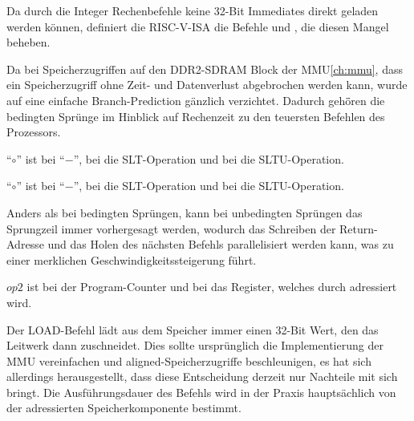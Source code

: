 
Da durch die Integer Rechenbefehle keine 32-Bit Immediates direkt geladen werden
k\"onnen, definiert die RISC-V-ISA die Befehle  und , die
diesen Mangel beheben.



Da bei Speicherzugriffen auf den DDR2-SDRAM Block der MMU\ref{ch:mmu}, dass ein
Speicherzugriff ohne Zeit- und Datenverlust abgebrochen werden kann, wurde auf
eine einfache Branch-Prediction g\"anzlich verzichtet. Dadurch geh\"ören die
bedingten Spr\"unge im Hinblick auf Rechenzeit zu den teuersten Befehlen des
Prozessors.

{``\(\circ\)'' ist bei  ``\(-\)'', bei  die SLT-Operation
und bei  die SLTU-Operation.
}

{``\(\circ\)'' ist bei  ``\(-\)'', bei  die SLT-Operation
und bei  die SLTU-Operation.
}

Anders als bei bedingten Spr\"ungen, kann bei unbedingten Spr\"ungen das
Sprungzeil immer vorhergesagt werden, wodurch das Schreiben der Return-Adresse
und das Holen des n\"achsten Befehls parallelisiert werden kann, was zu einer
merklichen Geschwindigkeitssteigerung f\"uhrt.

{\(op2\) ist bei  der Program-Counter und bei  das
Register, welches durch  adressiert wird.
}

Der LOAD-Befehl l\"adt aus dem Speicher immer einen 32-Bit Wert, den das
Leitwerk dann zuschneidet. Dies sollte urspr\"unglich die Implementierung der
MMU vereinfachen und aligned-Speicherzugriffe beschleunigen, es hat sich
allerdings herausgestellt, dass diese Entscheidung derzeit nur Nachteile mit
sich bringt. Die Ausf\"uhrungsdauer des Befehls wird in der Praxis
haupts\"achlich von der adressierten Speicherkomponente bestimmt.

